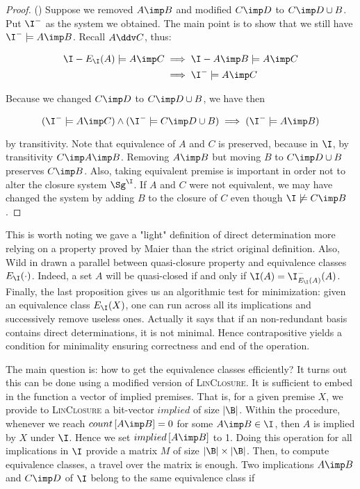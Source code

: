 \begin{proof}() Suppose we removed $A \imp B$ and modified
$C \imp D$ to $C \imp D \cup B$. Put $\I^{-}$ as the system we obtained. 
The main point is to show that we still have $\I^{-} \models A \imp B$. Recall 
$A \ddv C$, thus:

\begin{align*}
	\I - E_{\I}(A) \models A \imp C & \implies \I - A \imp B \models A \imp 
	C \\
	& \implies \I^{-} \models A \imp C \\ 
\end{align*}

\noindent Because we changed $C \imp D$ to $C \imp D \cup B$, we have then

\[ (\I^{-} \models A \imp C) \land (\I^{-} \models C \imp D \cup B) \implies
	(\I^{-} \models A \imp B) \]

\noindent by transitivity. Note that equivalence of $A$ and $C$ is 
preserved, because in $\I$, by transitivity $C \imp A \imp B$. Removing $A \imp 
B$ but moving $B$ to $C \imp D \cup B$ preserves $C \imp B$. Also, taking 
equivalent premise is important in order not to alter the closure system 
$\Sg^{\I}$. If $A$ and $C$ were not equivalent, we may have changed the system 
by adding $B$ to the closure of $C$ even though $\I \not\models C \imp B$.
\end{proof}

\vspace{1.2em}

This is worth noting we gave a "light" definition of direct determination more
relying on a property proved by Maier than the strict original definition. 
Also, Wild in \cite{wild_implicational_1989, wild_theory_1994} drawn a parallel
between quasi-closure property and equivalence classes $E_{\I}(\cdot)$. 
Indeed, a set $A$ will be quasi-closed if and only if $\I(A) = 
\I^{-}_{E_{\I}(A)}(A)$. Finally, the last proposition gives us an algorithmic 
test for minimization: given an equivalence class $E_{\I}(X)$, one can run 
across all its implications and successively remove useless ones. Actually it 
says that if an non-redundant basis contains direct determinations, it is not 
minimal. Hence contrapositive yields a condition for minimality ensuring 
correctness and end of the operation.

\vspace{1.2em}

The main question is: how to get the equivalence classes efficiently? It turns
out this can be done using a modified version of \textsc{LinClosure}. It is 
sufficient to embed in the function a vector of implied premises. That is, 
for a given premise $X$, we provide to \textsc{LinClosure} a bit-vector 
$implied$ of size
$|\B|$. Within the procedure, whenever we reach $count\left[A \imp B \right] = 
0$ for some $A \imp B \in \I$, then $A$ is implied by $X$ under $\I$. Hence we 
set $implied\left[ A \imp B\right]$ to 1. Doing this operation for all 
implications in $\I$ provide a matrix $M$ of size $|\B| \times |\B|$. Then, to 
compute equivalence classes, a travel over the matrix is enough. Two 
implications $A \imp B$ and $C \imp D$ of $\I$ belong to the same equivalence 
class if 

